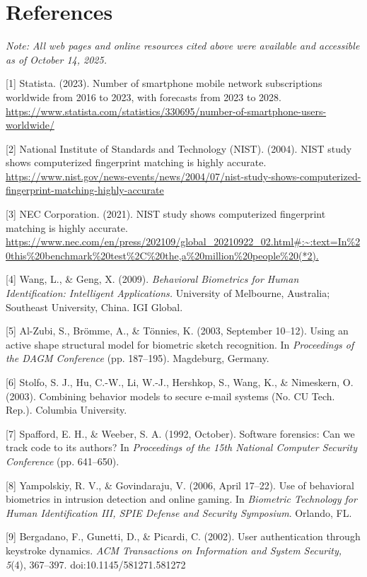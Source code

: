 \documentclass[12pt]{report}
\begin{document}
\chapter*{References}
\begin{raggedright}

\textit{Note: All web pages and online resources cited above were available and accessible as of October 14, 2025.}

[1] Statista. (2023). Number of smartphone mobile network subscriptions worldwide from 2016 to 2023, with forecasts from 2023 to 2028. \url{https://www.statista.com/statistics/330695/number-of-smartphone-users-worldwide/}

[2] National Institute of Standards and Technology (NIST). (2004). NIST study shows computerized fingerprint matching is highly accurate. \url{https://www.nist.gov/news-events/news/2004/07/nist-study-shows-computerized-fingerprint-matching-highly-accurate}

[3] NEC Corporation. (2021). NIST study shows computerized fingerprint matching is highly accurate. \url{https://www.nec.com/en/press/202109/global_20210922_02.html#:~:text=In%20this%20benchmark%20test%2C%20the,a%20million%20people%20(*2).}

[4] Wang, L., \& Geng, X. (2009). \textit{Behavioral Biometrics for Human Identification: Intelligent Applications.} University of Melbourne, Australia; Southeast University, China. IGI Global.

[5] Al-Zubi, S., Brömme, A., \& Tönnies, K. (2003, September 10–12). Using an active shape structural model for biometric sketch recognition. In \textit{Proceedings of the DAGM Conference} (pp. 187–195). Magdeburg, Germany.

[6] Stolfo, S. J., Hu, C.-W., Li, W.-J., Hershkop, S., Wang, K., \& Nimeskern, O. (2003). Combining behavior models to secure e-mail systems (No. CU Tech. Rep.). Columbia University.

[7] Spafford, E. H., \& Weeber, S. A. (1992, October). Software forensics: Can we track code to its authors? In \textit{Proceedings of the 15th National Computer Security Conference} (pp. 641–650).

[8] Yampolskiy, R. V., \& Govindaraju, V. (2006, April 17–22). Use of behavioral biometrics in intrusion detection and online gaming. In \textit{Biometric Technology for Human Identification III, SPIE Defense and Security Symposium}. Orlando, FL.

[9] Bergadano, F., Gunetti, D., \& Picardi, C. (2002). User authentication through keystroke dynamics. \textit{ACM Transactions on Information and System Security, 5}(4), 367–397. doi:10.1145/581271.581272


\end{raggedright}
\end{document}
